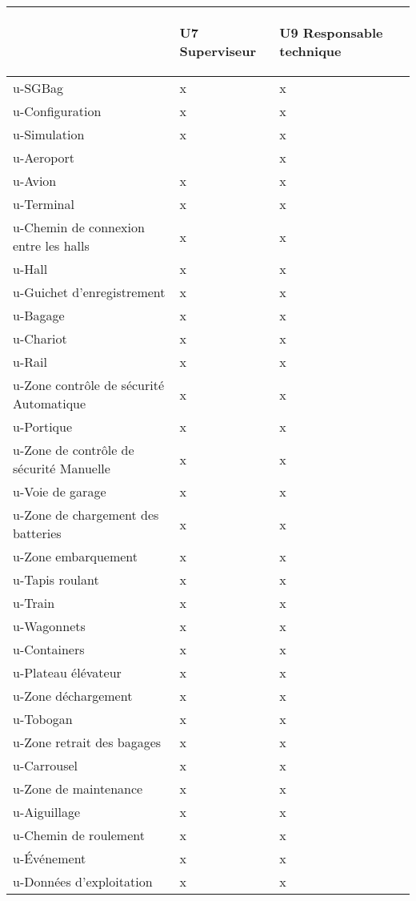 \begin {tabular} {| l | l | l |}
\hline
~
&\begin{sideways}U7 Superviseur\end{sideways}
&\begin{sideways}U9 Responsable technique~\end{sideways}\\
\hline
u-SGBag &x &x \\
\hline
u-Configuration &x &x \\
\hline
u-Simulation &x &x \\
\hline
u-Aeroport & &x \\
\hline
u-Avion  &x &x \\
\hline
u-Terminal  &x &x \\
\hline
u-Chemin de connexion entre les halls &x &x \\
\hline
u-Hall  &x &x \\
\hline
u-Guichet d'enregistrement &x &x \\
\hline
u-Bagage  &x &x \\
\hline
u-Chariot  &x &x \\
\hline
u-Rail &x &x \\
\hline
u-Zone contrôle de sécurité Automatique &x &x \\
\hline
u-Portique &x &x \\
\hline
u-Zone de contrôle de sécurité Manuelle &x &x \\
\hline
u-Voie de garage &x &x \\
\hline
u-Zone de chargement des batteries  &x &x \\
\hline
u-Zone embarquement  &x &x \\
\hline
u-Tapis roulant  &x &x \\
\hline
u-Train  &x &x \\
\hline
u-Wagonnets  &x &x \\
\hline
u-Containers  &x &x \\
\hline
u-Plateau élévateur  &x &x \\
\hline
u-Zone déchargement  &x &x \\
\hline
u-Tobogan  &x &x \\
\hline
u-Zone retrait des bagages  &x &x \\
\hline
u-Carrousel  &x &x \\
\hline
u-Zone de maintenance &x &x \\
\hline
u-Aiguillage &x &x \\
\hline
u-Chemin de roulement &x &x \\
\hline
u-\'{E}vénement &x &x \\
\hline
u-Données d'exploitation &x &x \\
\hline
\end {tabular}
